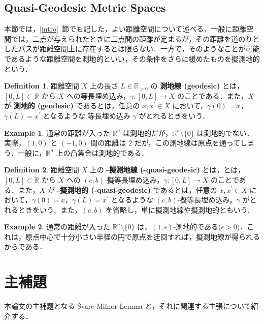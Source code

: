 \documentclass[dvipdfmx]{ujarticle}
\theoremstyle{definition}
\newtheorem{dfn}{Definition}[section]
\newtheorem*{ex*}{Example}
\begin{document}
\subsection{Quasi-Geodesic Metric Spaces}
本節では，\ref{intro}~節でも記した，よい距離空間について述べる．一般に距離空間では，二点が与えられたときに二点間の距離が定まるが，その距離を道のりとしたパスが距離空間上に存在するとは限らない．一方で，そのようなことが可能であるような距離空間を測地的といい，その条件をさらに緩めたものを擬測地的という．
\begin{dfn}
距離空間 $X$ 上の長さ $L\in\mathbb{R}_{>0}$ の \textbf{測地線 (geodesic)} とは，$[0,L]\subset\mathbb{R}$ から $X$ への等長埋め込み，$\gamma\colon[0,L]\rightarrow X$ のことである．また，$X$ が \textbf{測地的 (geodesic)} であるとは，任意の $x,x^\prime\in X$ において，$\gamma(0)=x$，$\gamma(L)=x^\prime$ となるような 等長埋め込み $\gamma$ がとれるときをいう．
\end{dfn}

\begin{ex*}
通常の距離が入った $\mathbb{R}^n$ は測地的だが，$\mathbb{R}^n\setminus\{0\}$ は測地的でない．実際，$(1,0)$ と $(-1,0)$ 間の距離は $2$ だが，この測地線は原点を通ってしまう．一般に，$\mathbb{R}^n$ 上の凸集合は測地的である．
\end{ex*}

\begin{dfn}
距離空間 $X$ 上の \textbf{-擬測地線 (-quasi-geodesic)} とは，とは，$[0,L]\subset\mathbb{R}$ から $X$ への $(c,b)$-擬等長埋め込み，$\gamma\colon[0,L]\rightarrow X$ のことである．また，$X$ が \textbf{-擬測地的 (-quasi-geodesic)} であるとは，任意の $x,x^\prime\in X$ において，$\gamma(0)=x$，$\gamma(L)=x^\prime$ となるような $(c,b)$-擬等長埋め込み，$\gamma$ がとれるときをいう．また，$(c,b)$ を省略し，単に擬測地線や擬測地的ともいう．
\end{dfn}

\begin{ex*}
通常の距離が入った $\mathbb{R}^n\setminus\{0\}$ は，$(1,\epsilon)$-測地的である($\epsilon>0$)．これは，原点中心で十分小さい半径の円で原点を迂回すれば，擬測地線が得られるからである．
\end{ex*}

\section{主補題}\label{sec_hodai}
本論文の主補題となる Švarc-Milnor Lemma と，それに関連する主張について紹介する．
\end{document}
